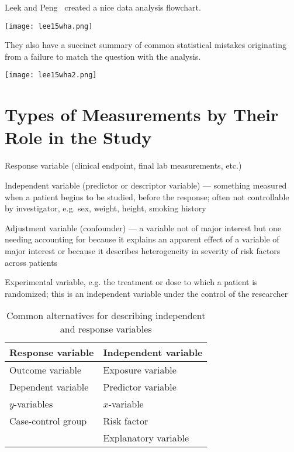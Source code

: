 Leek and Peng~\cite{lee15wha} created a nice data analysis flowchart.

\begin{center}\texttt{[image: lee15wha.png]}\end{center}

They also have a succinct summary of common statistical mistakes
originating from a failure to match the question with the analysis.

\begin{center}\texttt{[image: lee15wha2.png]}\end{center}

\section{Types of Measurements by Their Role in the Study}  \label{sec:overview-measurement-role}
\bi
 \item Response variable (clinical endpoint, final lab measurements,
   etc.)
 \item Independent variable (predictor or descriptor variable) ---
   something measured when a patient begins to be studied, before the
   response; often not controllable by 
   investigator, e.g. sex, weight, height, smoking history
 \item Adjustment variable (confounder) --- a variable not of major
   interest but one needing accounting for because it explains an
   apparent effect of a variable of major interest or because it
   describes heterogeneity in severity of risk factors across patients
 \item Experimental variable, e.g. the treatment or dose to which a
   patient is randomized; this is an independent variable under the
   control of the researcher
 \ei

\begin{table}[h!]
 \caption{Common alternatives for describing independent and response variables}
\begin{center}
\begin{tabular}{ll} \hline \hline
Response variable & Independent variable \\ \hline
Outcome variable & Exposure variable \\
Dependent variable & Predictor variable \\
$y$-variables &  $x$-variable \\
Case-control group &  Risk factor \\
 & Explanatory variable \\ \hline \hline
\end{tabular}
\end{center}
\end{table}

